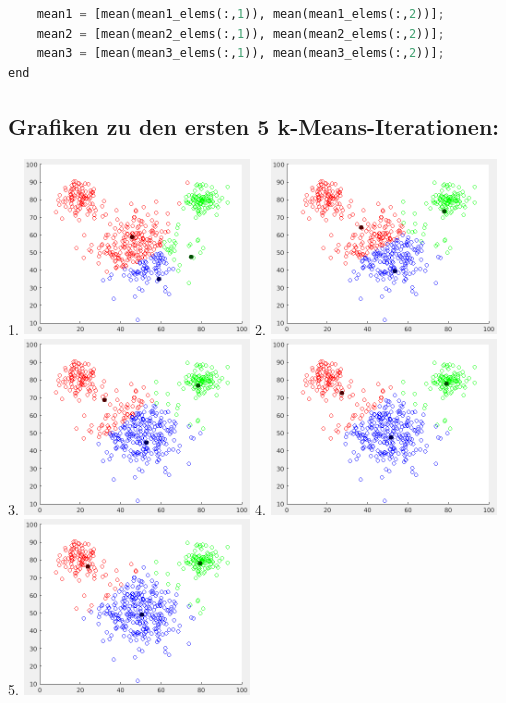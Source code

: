 \documentclass[12pt]{article}
\begin{document}
\begin{lstlisting}[language=Python]
    % Berechnung der neuen Clusterzentren aus den berechneten Cluster-Datenpunkten
    mean1 = [mean(mean1_elems(:,1)), mean(mean1_elems(:,2))];
    mean2 = [mean(mean2_elems(:,1)), mean(mean2_elems(:,2))];
    mean3 = [mean(mean3_elems(:,1)), mean(mean3_elems(:,2))];
end
\end{lstlisting}

\subsection{Grafiken zu den ersten 5 k-Means-Iterationen:}

1. \includegraphics[width=6cm]{kmeans_iter1.png}
2. \includegraphics[width=6cm]{kmeans_iter2.png}\\
3. \includegraphics[width=6cm]{kmeans_iter3.png}
4. \includegraphics[width=6cm]{kmeans_iter4.png}\\
5. \includegraphics[width=6cm]{kmeans_iter5.png}\\
\end{document}
